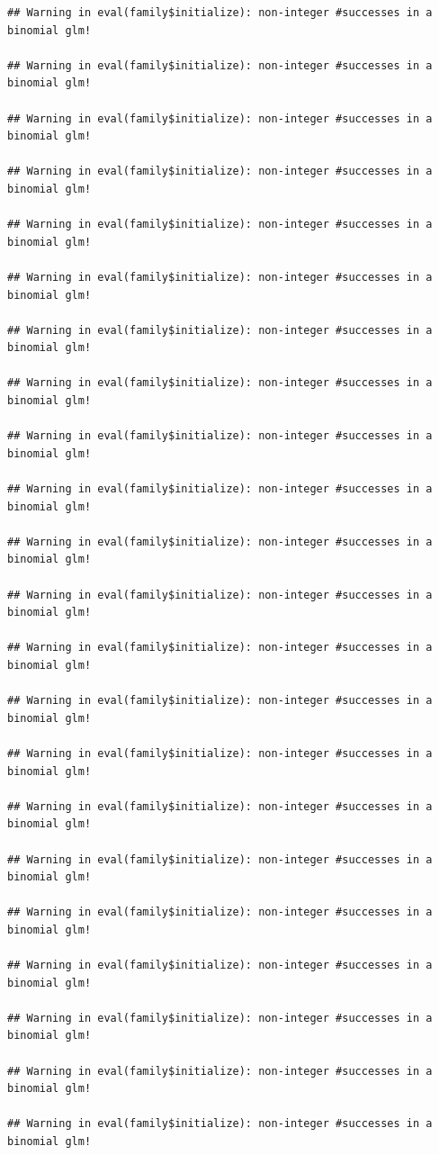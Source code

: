 \documentclass[
]{article}
\begin{document}
\begin{verbatim}
## Warning in eval(family$initialize): non-integer #successes in a binomial glm!

## Warning in eval(family$initialize): non-integer #successes in a binomial glm!

## Warning in eval(family$initialize): non-integer #successes in a binomial glm!

## Warning in eval(family$initialize): non-integer #successes in a binomial glm!

## Warning in eval(family$initialize): non-integer #successes in a binomial glm!

## Warning in eval(family$initialize): non-integer #successes in a binomial glm!

## Warning in eval(family$initialize): non-integer #successes in a binomial glm!

## Warning in eval(family$initialize): non-integer #successes in a binomial glm!

## Warning in eval(family$initialize): non-integer #successes in a binomial glm!

## Warning in eval(family$initialize): non-integer #successes in a binomial glm!

## Warning in eval(family$initialize): non-integer #successes in a binomial glm!

## Warning in eval(family$initialize): non-integer #successes in a binomial glm!

## Warning in eval(family$initialize): non-integer #successes in a binomial glm!

## Warning in eval(family$initialize): non-integer #successes in a binomial glm!

## Warning in eval(family$initialize): non-integer #successes in a binomial glm!

## Warning in eval(family$initialize): non-integer #successes in a binomial glm!

## Warning in eval(family$initialize): non-integer #successes in a binomial glm!

## Warning in eval(family$initialize): non-integer #successes in a binomial glm!

## Warning in eval(family$initialize): non-integer #successes in a binomial glm!

## Warning in eval(family$initialize): non-integer #successes in a binomial glm!

## Warning in eval(family$initialize): non-integer #successes in a binomial glm!

## Warning in eval(family$initialize): non-integer #successes in a binomial glm!


\end{verbatim}
\end{document}

